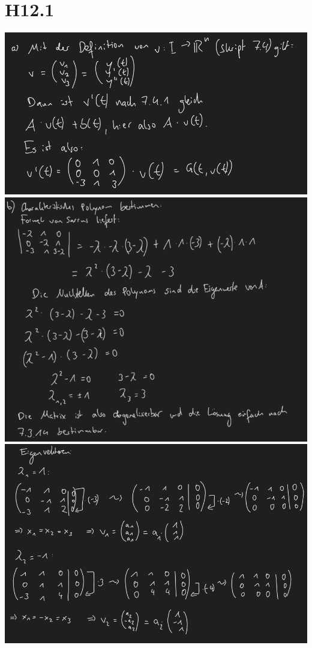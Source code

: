 \documentclass{article}
\begin{document}
\section*{H12.1}
\includegraphics[scale=0.5]{1} \\
\includegraphics[scale=0.5]{2} \\ 
\includegraphics[scale=0.5]{3} \\ 
\end{document}

